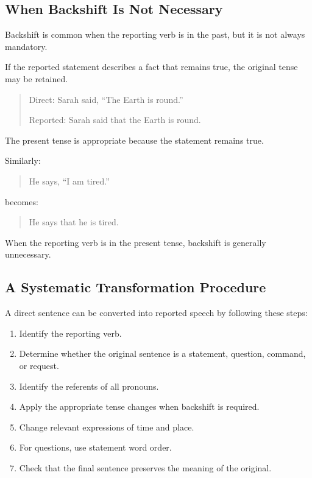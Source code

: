 \subsection{When Backshift Is Not Necessary}

Backshift is common when the reporting verb is in the past, but it is not
always mandatory.

If the reported statement describes a fact that remains true, the original
tense may be retained.

\begin{quotation}
Direct: Sarah said, ``The Earth is round.''

Reported: Sarah said that the Earth is round.
\end{quotation}

The present tense is appropriate because the statement remains true.

Similarly:

\begin{quotation}
He says, ``I am tired.''
\end{quotation}

becomes:

\begin{quotation}
He says that he is tired.
\end{quotation}

When the reporting verb is in the present tense, backshift is generally
unnecessary.


\subsection{A Systematic Transformation Procedure}

A direct sentence can be converted into reported speech by following these
steps:

\begin{enumerate}
    \item Identify the reporting verb.
    \item Determine whether the original sentence is a statement, question,
    command, or request.
    \item Identify the referents of all pronouns.
    \item Apply the appropriate tense changes when backshift is required.
    \item Change relevant expressions of time and place.
    \item For questions, use statement word order.
    \item Check that the final sentence preserves the meaning of the original.
\end{enumerate}


